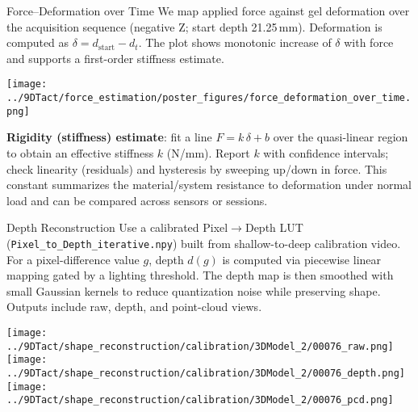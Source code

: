 \documentclass[final]{beamer}
\newlength{\colwidth}
\begin{document}
\begin{frame}[t]
\begin{columns}[t]
\begin{column}{\colwidth}
  \begin{block}{Force--Deformation over Time}
  We map applied force against gel deformation over the acquisition sequence (negative Z; start depth 21.25\,mm). Deformation is computed as $\delta = d_{\mathrm{start}} - d_t$. The plot shows monotonic increase of $\delta$ with force and supports a first-order stiffness estimate.
  \begin{center}
    \texttt{[image: ../9DTact/force\_estimation/poster\_figures/force\_deformation\_over\_time.png]}
  \end{center}
  \textbf{Rigidity (stiffness) estimate}: fit a line $F = k\,\delta + b$ over the quasi-linear region to obtain an effective stiffness $k$ (N/mm). Report $k$ with confidence intervals; check linearity (residuals) and hysteresis by sweeping up/down in force. This constant summarizes the material/system resistance to deformation under normal load and can be compared across sensors or sessions.
  \end{block}

  \begin{block}{Depth Reconstruction}
  Use a calibrated Pixel$\rightarrow$Depth LUT (\texttt{Pixel\_to\_Depth\_iterative.npy}) built from shallow-to-deep calibration video. For a pixel-difference value \(g\), depth \(d(g)\) is computed via piecewise linear mapping gated by a lighting threshold. The depth map is then smoothed with small Gaussian kernels to reduce quantization noise while preserving shape. Outputs include raw, depth, and point-cloud views.
  \begin{center}
    \texttt{[image: ../9DTact/shape\_reconstruction/calibration/3DModel\_2/00076\_raw.png]}\hfill
    \texttt{[image: ../9DTact/shape\_reconstruction/calibration/3DModel\_2/00076\_depth.png]}\hfill
    \texttt{[image: ../9DTact/shape\_reconstruction/calibration/3DModel\_2/00076\_pcd.png]}
  \end{center}
  \end{block}


\end{column}
\end{columns}
\end{frame}
\end{document}
